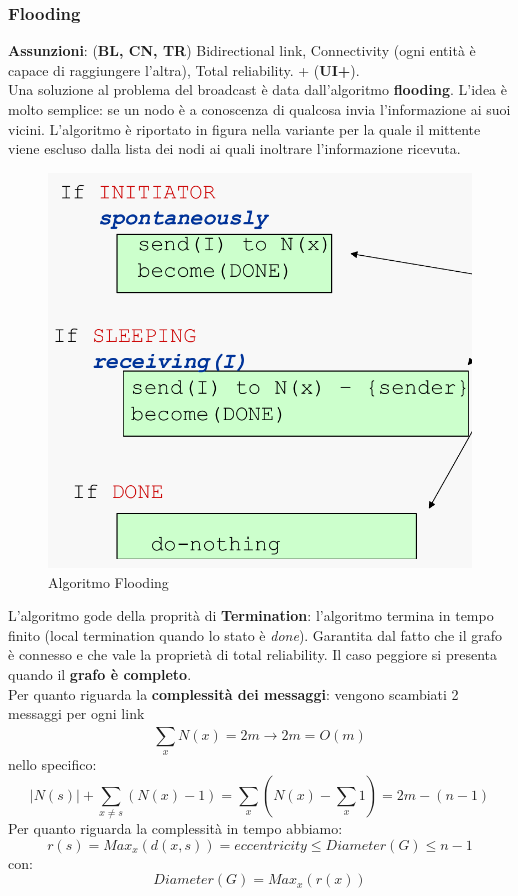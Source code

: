 \documentclass[12pt]{article}
\begin{document}
		\subsubsection{Flooding}
			\textbf{Assunzioni}: (\textbf{{BL, CN, TR}}) Bidirectional link, Connectivity (ogni entità è capace di raggiungere l'altra), Total reliability. + (\textbf{UI+}).\\
			Una soluzione al problema del broadcast è data dall'algoritmo \textbf{flooding}. L'idea è molto semplice: se un nodo è a conoscenza di qualcosa invia l'informazione ai suoi vicini. L'algoritmo è riportato in figura nella variante per la quale il mittente viene escluso dalla lista dei nodi ai quali inoltrare l'informazione ricevuta.
			\begin{figure}[h!]
				\centering
				\includegraphics[scale=0.4]{img/flood.png}
				\caption{Algoritmo Flooding}
			\end{figure}
		L'algoritmo gode della proprità di \textbf{Termination}: l'algoritmo termina in tempo finito (local termination quando lo stato è \textit{done}). Garantita dal fatto che il grafo è connesso e che vale la proprietà di total reliability. Il caso peggiore si presenta quando il \textbf{grafo è completo}.\\
		Per quanto riguarda la \textbf{complessità dei messaggi}: vengono scambiati 2 messaggi per ogni link $$\sum_{x}^{}N(x)=2m \rightarrow 2m = O(m) $$ nello specifico:
		$$|N(s)|+\sum_{x\neq s}^{}(N(x)-1)=\sum_{x}^{}(N(x)-\sum_{x}^{}1) = 2m-(n-1)$$
		Per quanto riguarda la complessità in tempo abbiamo:
		$$r(s)=Max_x(d(x,s))=eccentricity \leq Diameter(G) \leq n-1$$
		con:
		$$Diameter(G)=Max_x(r(x))  $$
		
\end{document}
